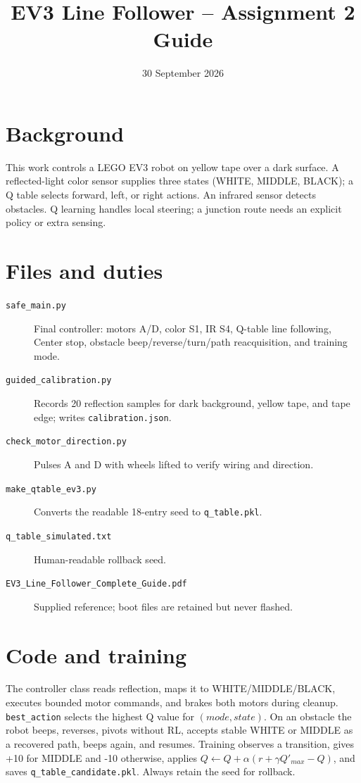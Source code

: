 \documentclass[11pt]{article}
\title{EV3 Line Follower -- Assignment 2 Guide}
\date{30 September 2026}
\begin{document}
\maketitle
\section{Background}
This work controls a LEGO EV3 robot on yellow tape over a dark surface. A reflected-light color sensor supplies three states (WHITE, MIDDLE, BLACK); a Q table selects forward, left, or right actions. An infrared sensor detects obstacles. Q learning handles local steering; a junction route needs an explicit policy or extra sensing.
\section{Files and duties}
\begin{description}
\item[\texttt{safe\_main.py}] Final controller: motors A/D, color S1, IR S4, Q-table line following, Center stop, obstacle beep/reverse/turn/path reacquisition, and training mode.
\item[\texttt{guided\_calibration.py}] Records 20 reflection samples for dark background, yellow tape, and tape edge; writes \texttt{calibration.json}.
\item[\texttt{check\_motor\_direction.py}] Pulses A and D with wheels lifted to verify wiring and direction.
\item[\texttt{make\_qtable\_ev3.py}] Converts the readable 18-entry seed to \texttt{q\_table.pkl}.
\item[\texttt{q\_table\_simulated.txt}] Human-readable rollback seed.
\item[\texttt{EV3\_Line\_Follower\_Complete\_Guide.pdf}] Supplied reference; boot files are retained but never flashed.
\end{description}
\section{Code and training}
The controller class reads reflection, maps it to WHITE/MIDDLE/BLACK, executes bounded motor commands, and brakes both motors during cleanup. \texttt{best\_action} selects the highest Q value for $(mode,state)$. On an obstacle the robot beeps, reverses, pivots without RL, accepts stable WHITE or MIDDLE as a recovered path, beeps again, and resumes. Training observes a transition, gives +10 for MIDDLE and -10 otherwise, applies $Q\leftarrow Q+\alpha(r+\gamma Q'_{max}-Q)$, and saves \texttt{q\_table\_candidate.pkl}. Always retain the seed for rollback.
\end{document}
